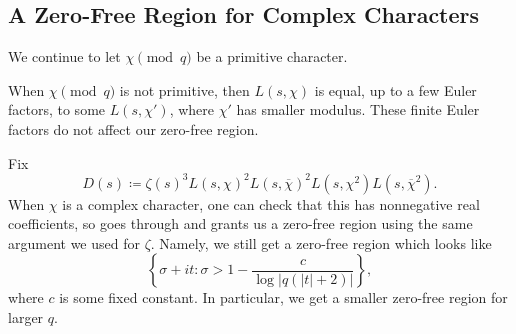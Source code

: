 \documentclass[../notes.tex]{subfiles}
\begin{document}
\subsection{A Zero-Free Region for Complex Characters}
We continue to let $\chi\pmod q$ be a primitive character.
\begin{remark}
	When $\chi\pmod q$ is not primitive, then $L(s,\chi)$ is equal, up to a few Euler factors, to some $L(s,\chi')$, where $\chi'$ has smaller modulus. These finite Euler factors do not affect our zero-free region.
\end{remark}
\begin{example}
	Fix
	\[D(s)\coloneqq\zeta(s)^3L(s,\chi)^2L(s,\overline\chi)^2L(s,\chi^2)L(s,\overline\chi^2).\]
	When $\chi$ is a complex character, one can check that this has nonnegative real coefficients, so  goes through and grants us a zero-free region using the same argument we used for $\zeta$. Namely, we still get a zero-free region which looks like
	\[\left\{\sigma+it:\sigma>1-\frac c{\log|q(|t|+2)|}\right\},\]
	where $c$ is some fixed constant. In particular, we get a smaller zero-free region for larger $q$.
\end{example}
\end{document}
